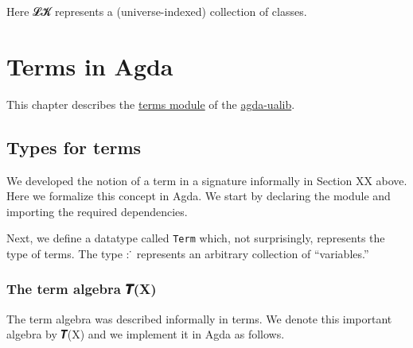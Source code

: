 \documentclass[sigplan,screen]{acmart}
\newcommand\ab[1]{\AgdaBound{#1}}
\newcommand{\agdaualib}{\href{https://ualib.org}{agda-ualib}\xspace}
\newcommand\termsmodule{\href{https://gitlab.com/ualib/ualib.gitlab.io/-/blob/master/terms.lagda.rst}{terms module}\xspace}
\begin{document}
Here 𝓛𝓚 represents a (universe-indexed) collection of classes.
\begin{code}\end{code}



\section{Terms in Agda}\label{terms-in-agda}
This chapter describes the \termsmodule of the \agdaualib.

\subsection{Types for terms}\label{types-for-terms}
We developed the notion of a term in a signature informally in Section XX above.
Here we formalize this concept in Agda. We start by declaring the module and importing the required
dependencies.
\begin{code}\end{code}

Next, we define a datatype called \texttt{Term} which, not surprisingly, represents the type of terms. The type \ab 𝑋 : \ab 𝒰 ̇ represents an arbitrary collection of ``variables.''
\begin{code}\end{code}

\subsubsection{The term algebra 𝑻(X)}\label{the-term-algebra-ux1d47bx}
The term algebra was described informally in terms. We denote this important algebra by 𝑻(X) and we implement it in Agda as follows.
\begin{code}\end{code}
\end{document}
